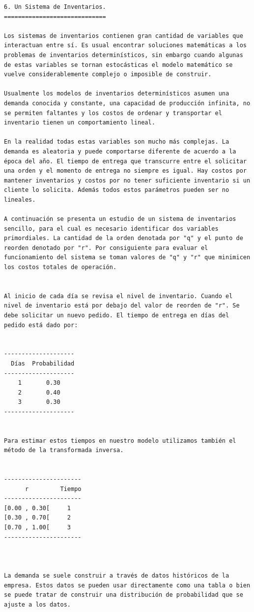\begin{verbatim}
6. Un Sistema de Inventarios.
=============================

Los sistemas de inventarios contienen gran cantidad de variables que interactuan entre sí. Es usual encontrar soluciones matemáticas a los problemas de inventarios determinísticos, sin embargo cuando algunas de estas variables se tornan estocásticas el modelo matemático se vuelve considerablemente complejo o imposible de construir.

Usualmente los modelos de inventarios determinísticos asumen una demanda conocida y constante, una capacidad de producción infinita, no se permiten faltantes y los costos de ordenar y transportar el inventario tienen un comportamiento lineal.

En la realidad todas estas variables son mucho más complejas. La demanda es aleatoria y puede comportarse diferente de acuerdo a la época del año. El tiempo de entrega que transcurre entre el solicitar una orden y el momento de entrega no siempre es igual. Hay costos por mantener inventarios y costos por no tener suficiente inventario si un cliente lo solicita. Además todos estos parámetros pueden ser no lineales.

A continuación se presenta un estudio de un sistema de inventarios sencillo, para el cual es necesario identificar dos variables primordiales. La cantidad de la orden denotada por "q" y el punto de reorden denotado por "r". Por consiguiente para evaluar el funcionamiento del sistema se toman valores de "q" y "r" que minimicen los costos totales de operación.


Al inicio de cada día se revisa el nivel de inventario. Cuando el nivel de inventario está por debajo del valor de reorden de "r". Se debe solicitar un nuevo pedido. El tiempo de entrega en días del pedido está dado por:


--------------------
  Días  Probabilidad
--------------------
    1       0.30
    2       0.40
    3       0.30
--------------------


Para estimar estos tiempos en nuestro modelo utilizamos también el método de la transformada inversa.


----------------------
      r         Tiempo
----------------------
[0.00 , 0.30[     1
[0.30 , 0.70[     2
[0.70 , 1.00[     3
----------------------



La demanda se suele construir a través de datos históricos de la empresa. Estos datos se pueden usar directamente como una tabla o bien se puede tratar de construir una distribución de probabilidad que se ajuste a los datos. 


\end{verbatim}
